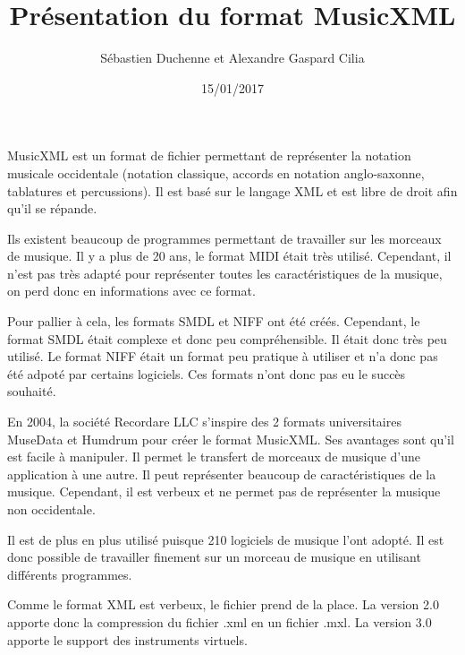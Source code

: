 \documentclass[a4paper, 12pt]{article}
\title{Présentation du format MusicXML}
\author{Sébastien Duchenne et Alexandre Gaspard Cilia}
\date{15/01/2017}
\begin{document}
\maketitle

\par
MusicXML est un format de fichier permettant de représenter la notation musicale occidentale (notation classique, accords en notation anglo-saxonne, tablatures et percussions). Il est basé sur le langage XML et est libre de droit afin qu’il se répande.

\par
Ils existent beaucoup de programmes permettant de travailler sur les morceaux de musique. Il y a plus de 20 ans, le format MIDI était très utilisé. Cependant, il n’est pas très adapté pour représenter toutes les caractéristiques de la musique, on perd donc en informations avec ce format. 

\par
Pour pallier à cela, les formats SMDL et NIFF ont été créés. Cependant, le format SMDL était complexe et donc peu compréhensible. Il était donc très peu utilisé. Le format NIFF était un format peu pratique à utiliser et n’a donc pas été adpoté par certains logiciels. Ces formats n’ont donc pas eu le succès souhaité.

\par
En 2004, la société Recordare LLC s’inspire des 2 formats universitaires MuseData et Humdrum pour créer le format MusicXML. Ses avantages sont qu’il est facile à manipuler. Il permet le transfert de morceaux de musique d’une application à une autre. Il peut représenter beaucoup de caractéristiques de la musique. Cependant, il est verbeux et ne permet pas de représenter la musique non occidentale.

\par
Il est de plus en plus utilisé puisque 210 logiciels de musique l’ont adopté. Il est donc possible de travailler finement sur un morceau de musique en utilisant différents programmes. 

\par
Comme le format XML est verbeux, le fichier prend de la place. La version 2.0 apporte donc la compression du fichier .xml en un fichier .mxl. La version 3.0 apporte le support des instruments virtuels.
\end{document}
